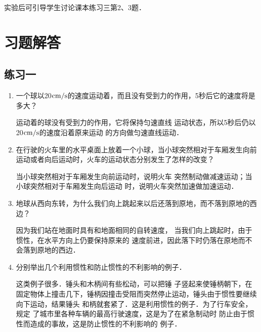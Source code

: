 实验后可引导学生讨论课本练习三第2、3题．

\section{习题解答}

\subsection{练习一}
\begin{enumerate}
	 \item 一个球以20${\rm cm/s}$的速度运动着，而且没有受到力的作用，5秒后它的速度将是多大？
	 
     \begin{solution}
        运动着的球没有受到力的作用，它将保持匀速直线
        运动状态，所以5秒后仍以20${\rm cm/s}$的速度沿着原来运动
        的方向做匀速直线运动．
     \end{solution}
	 \item 在行驶的火车里的水平桌面上放着一个小球，当小球突然相对于车厢发生向前运动或者向后运动时，火车的运动状态分别发生了怎样的改变？
	 
     \begin{solution}
        当小球突然相对于车厢发生向前运动时，说明火车
        突然制动做减速运动；当小球突然相对于车厢发生向后运动
        时，说明火车突然加速做加速运动．
     \end{solution}
	 \item 地球从西向东转，为什么我们向上跳起来以后还落到原地，而不落到原地的西边？
	 
     \begin{solution}
        因为我们站在地面时具有和地面相同的自转速度，
        当我们向上跳起时，由于惯性，在水平方向上仍要保持原来的
        速度前进，因此落下时仍落在原地而不会落到原地的西边．
     \end{solution}
	 \item 分别举出几个利用惯性和防止惯性的不利影响的例子．
	 
     \begin{solution}
        这类例子很多．锤头和木柄间有些松动，可以把锤
        子竖起来使锤柄朝下，在固定物体上撞击几下，锤柄因撞击受阻而突然停止运动，锤头由于惯性要继续向下运动，结果锤头
        和柄就套紧了．这是利用惯性的例子．为了行车安全，规定
        了城市里各种车辆的最高行驶速度，这是为了在紧急制动时
        防止由于惯性而造成的事故，这是防止惯性的不利影响的
        例子．
     \end{solution}
\end{enumerate}



